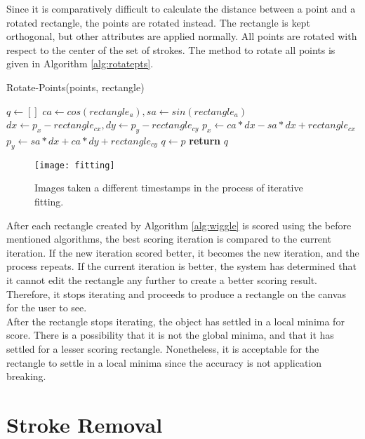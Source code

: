 Since it is comparatively difficult to calculate the distance between a point and a rotated rectangle, the points are rotated instead. The rectangle is kept orthogonal, but other attributes are applied normally. All points are rotated with respect to the center of the set of strokes. The method to rotate all points is given in Algorithm \ref{alg:rotatepts}. \\

\begin{algorithm}
\caption{Rotate-Points(points, rectangle)}
\label{alg:rotatepts}
\begin{algorithmic}[1]
\State $q \gets []$
    \State $ca \gets cos(rectangle_a), sa \gets sin(rectangle_a)$
    \State $dx \gets p_x-rectangle_{cx}, dy \gets p_y-rectangle_{cy}$
    \State $p_x \gets ca*dx-sa*dx + rectangle_{cx}$
    \State $p_y \gets sa*dx+ca*dy + rectangle_{cy} $
    \State $q \gets p$
\EndFor
\State \textbf{return} $q$
\end{algorithmic}
\end{algorithm}

\begin{figure}[ht]
\centering
\texttt{[image: fitting]}
\caption[Iterative step images taken during the rectangle fitting process]{Images taken a different timestamps in the process of iterative fitting.}
\label{fig:fitting}
\end{figure}

After each rectangle created by Algorithm \ref{alg:wiggle} is scored using the before mentioned algorithms, the best scoring iteration is compared to the current iteration. If the new iteration scored better, it becomes the new iteration, and the process repeats. If the current iteration is better, the system has determined that it cannot edit the rectangle any further to create a better scoring result. Therefore, it stops iterating and proceeds to produce a rectangle on the canvas for the user to see. \\

After the rectangle stops iterating, the object has settled in a local minima for score. There is a possibility that it is not the global minima, and that it has settled for a lesser scoring rectangle. Nonetheless, it is acceptable for the rectangle to settle in a local minima since the accuracy is not application breaking. 

\section{Stroke Removal}
\label{sec:strokeremoval}

